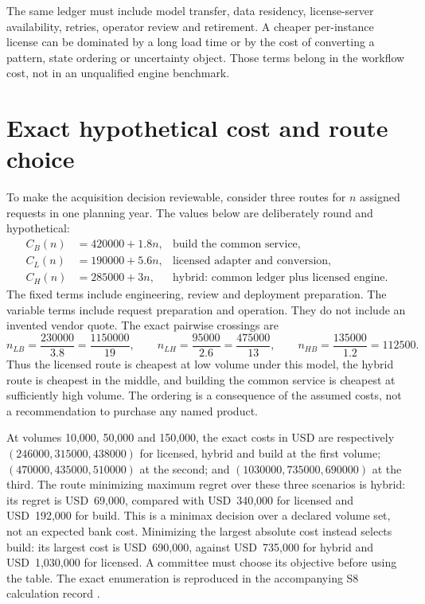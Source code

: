 The same ledger must include model transfer, data residency, license-server
availability, retries, operator review and retirement. A cheaper per-instance
license can be dominated by a long load time or by the cost of converting a
pattern, state ordering or uncertainty object. Those terms belong in the
workflow cost, not in an unqualified engine benchmark.

\section{Exact hypothetical cost and route choice}
\label{exec17:s8-cost}

To make the acquisition decision reviewable, consider three routes for $n$
assigned requests in one planning year. The values below are deliberately
round and hypothetical:
\begin{align}
 C_B(n)&=420000+1.8n, &\text{build the common service},\\
 C_L(n)&=190000+5.6n, &\text{licensed adapter and conversion},\\
 C_H(n)&=285000+3n, &\text{hybrid: common ledger plus licensed engine}.
 \label{exec17:s8-costs}
\end{align}
The fixed terms include engineering, review and deployment preparation. The
variable terms include request preparation and operation. They do not include
an invented vendor quote. The exact pairwise crossings are
\begin{equation}
 n_{LB}=\frac{230000}{3.8}=\frac{1150000}{19},\qquad
 n_{LH}=\frac{95000}{2.6}=\frac{475000}{13},\qquad
 n_{HB}=\frac{135000}{1.2}=112500.
 \label{exec17:s8-crossings}
\end{equation}
Thus the licensed route is cheapest at low volume under this model, the
hybrid route is cheapest in the middle, and building the common service is
cheapest at sufficiently high volume. The ordering is a consequence of the
assumed costs, not a recommendation to purchase any named product.

At volumes 10,000, 50,000 and 150,000, the exact costs in USD are respectively
$(246000,315000,438000)$ for licensed, hybrid and build at the first volume;
$(470000,435000,510000)$ at the second; and $(1030000,735000,690000)$ at the
third. The route minimizing maximum regret over these three scenarios is hybrid:
its regret is USD~69,000, compared with USD~340,000 for licensed and USD~192,000 for
build. This is a minimax decision over a declared volume set, not an expected
bank cost. Minimizing the largest absolute cost instead selects build: its
largest cost is USD~690,000, against USD~735,000 for hybrid and USD~1,030,000
for licensed. A committee must choose its objective before using the table.
The exact enumeration is reproduced in the accompanying S8 calculation record
\citep{exec17_s8_examples}.

